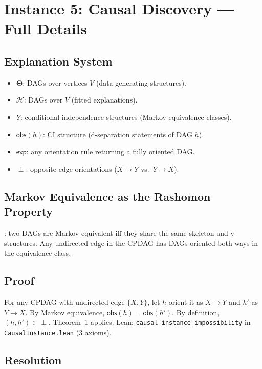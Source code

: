 \documentclass{article}
\newcommand{\Params}{\mathbf{\Theta}}
\newcommand{\sH}{\mathcal{H}}
\newcommand{\incomp}{\perp}
\begin{document}
\section{Instance 5: Causal Discovery --- Full Details}
\label{sec:causal-full}

\subsection{Explanation System}

\begin{itemize}
  \item $\Params$: DAGs over vertices $V$ (data-generating structures).
  \item $\sH$: DAGs over $V$ (fitted explanations).
  \item $Y$: conditional independence structures (Markov equivalence classes).
  \item $\mathsf{obs}(h)$: CI structure (d-separation statements of DAG $h$).
  \item $\mathsf{exp}$: any orientation rule returning a fully oriented DAG.
  \item $\incomp$: opposite edge orientations ($X \to Y$ vs.\ $Y \to X$).
\end{itemize}

\subsection{Markov Equivalence as the Rashomon Property}

\citet{verma1991equivalence}: two DAGs are Markov equivalent iff they share the same skeleton and v-structures.  Any undirected edge in the CPDAG has DAGs oriented both ways in the equivalence class.

\subsection{Proof}

For any CPDAG with undirected edge $\{X,Y\}$, let $h$ orient it as $X \to Y$ and $h'$ as $Y \to X$.  By Markov equivalence, $\mathsf{obs}(h) = \mathsf{obs}(h')$.  By definition, $(h, h') \in \incomp$.  Theorem~1 applies.  Lean: \texttt{causal\_instance\_impossibility} in \texttt{CausalInstance.lean} (3 axioms).

\subsection{Resolution}
\end{document}
